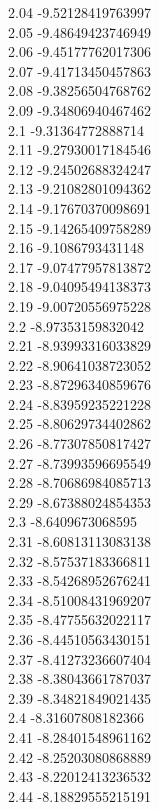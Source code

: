 {2.04	-9.52128419763997\\
2.05	-9.48649423746949\\
2.06	-9.45177762017306\\
2.07	-9.41713450457863\\
2.08	-9.38256504768762\\
2.09	-9.34806940467462\\
2.1	-9.31364772888714\\
2.11	-9.27930017184546\\
2.12	-9.24502688324247\\
2.13	-9.21082801094362\\
2.14	-9.17670370098691\\
2.15	-9.14265409758289\\
2.16	-9.1086793431148\\
2.17	-9.07477957813872\\
2.18	-9.04095494138373\\
2.19	-9.00720556975228\\
2.2	-8.97353159832042\\
2.21	-8.93993316033829\\
2.22	-8.90641038723052\\
2.23	-8.87296340859676\\
2.24	-8.83959235221228\\
2.25	-8.80629734402862\\
2.26	-8.77307850817427\\
2.27	-8.73993596695549\\
2.28	-8.70686984085713\\
2.29	-8.67388024854353\\
2.3	-8.6409673068595\\
2.31	-8.60813113083138\\
2.32	-8.57537183366811\\
2.33	-8.54268952676241\\
2.34	-8.51008431969207\\
2.35	-8.47755632022117\\
2.36	-8.44510563430151\\
2.37	-8.41273236607404\\
2.38	-8.38043661787037\\
2.39	-8.34821849021435\\
2.4	-8.31607808182366\\
2.41	-8.28401548961162\\
2.42	-8.25203080868889\\
2.43	-8.22012413236532\\
2.44	-8.18829555215191\\
}
